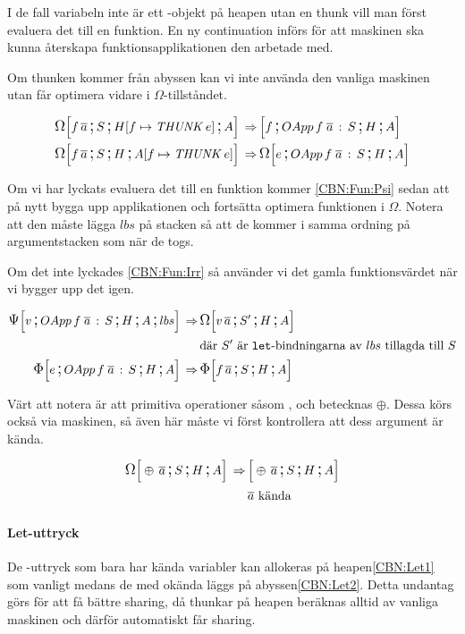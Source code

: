 \documentclass[../Optimise]{subfiles}
\begin{document}
I de fall variabeln inte är ett -objekt på heapen utan en thunk vill man först evaluera
det till en funktion. En ny continuation  införs för att maskinen
ska kunna återskapa funktionsapplikationen den arbetade med.

Om thunken kommer från abyssen kan vi inte använda den vanliga maskinen utan får
optimera vidare i $\Omega$-tillståndet.

\begin{align}
\CBNOMEGA S{\heap f{\THUNK e}}A{f\, \many{a}}  \rulesep & \CBNMC f{\cOApp f{\many{a}}S}HA\\
\CBNOMEGA SH{\abyss f{\THUNK e}}{f\, \many{a}}  \rulesep & \CBNOMEGA{\cOApp f{\many{a}}S}HAe
\end{align}

Om vi har lyckats evaluera det till en funktion kommer \eqref{CBN:Fun:Psi} sedan att
på nytt bygga upp applikationen och fortsätta optimera funktionen i $\Omega$.
Notera att den måste lägga $lbs$ på stacken så att de kommer i samma ordning på 
argumentstacken som när de togs.

Om det inte lyckades \eqref{CBN:Fun:Irr} så använder vi det gamla funktionsvärdet
när vi bygger upp det igen.

\begin{align}
\label{CBN:Fun:Psi}\CBNPSI{\cOApp f{\many{a}}S}HA{lbs}v  \rulesep & \CBNOMEGA {S'}HA{v\, \many{a}} \\
 & \text{där } S' \text{ är \kw{let}-bindningarna av } lbs \text{ tillagda till } S \nonumber \\
\label{CBN:Fun:Irr}\CBNIRR {\cOApp f {\many{a}}S}HAe  \rulesep & \CBNIRR SHA{f\, \many{a}}
\end{align}

Värt att notera är att primitiva operationer såsom \ic{+\#}, \ic{*\#} och \ic{==\#} betecknas $\oplus$. 
Dessa körs också via maskinen, så även här måste vi först kontrollera att dess argument
är kända.

\begin{align}
\CBNOMEGA SHA{\oplus\, \many{a}}  \rulesep & \CBNMC{\oplus\, \many{a}}SHA \\
 & \many{a} \text{ kända } \nonumber
\end{align}


\paragraph{Let-uttryck}
De -uttryck som bara har kända variabler kan allokeras på heapen\eqref{CBN:Let1} som vanligt
medans de med okända läggs på abyssen\eqref{CBN:Let2}.
Detta undantag görs för att få bättre sharing, då thunkar på heapen beräknas alltid
av vanliga maskinen och därför automatiskt får sharing.
\end{document}
